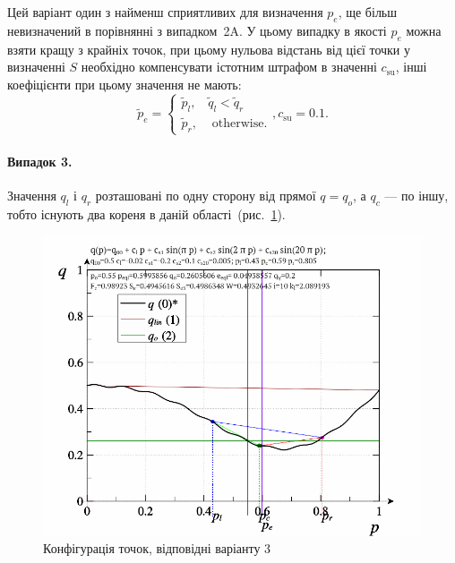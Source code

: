 Цей варіант один з найменш сприятливих для визначення
$ p_e $, ще більш невизначений в порівнянні з випадком~2A. У цьому
випадку в якості
$ p_e $ можна взяти кращу з крайніх точок, при цьому нульова
відстань від цієї точки у визначенні
$ S $ необхідно компенсувати істотним штрафом в значенні
$ c_\mathrm{su} $, інші коефіцієнти при цьому значення не мають:
%
\begin{equation}
  \tilde{p}_e
  =
  \begin{cases}
    \tilde{p}_{l}, & \tilde{q}_l < \tilde{q}_r
    \\
    \tilde{p}_{r}, & \text{ otherwise}.
  \end{cases}
  ,
  c_\mathrm{su} = 0.1 .
  \label{atu:eq:pr_e2C}
\end{equation}

\paragraph{Випадок 3.}%
%
Значення
$ q_l $ і
$ q_r $ розташовані по одну сторону від прямої
$ q = q_o $, а
$ q_c $ --- по іншу, тобто існують два кореня в даній
області~(рис.~\ref{atu:f:pq_3}).

\begin{figure}[htb!]
  \begin{center}
    \includegraphics[width=60\TW]{p/pq_sin-p_pq_double.png}
  \end{center}
  \caption{Конфігурація точок, відповідні варіанту 3}
  \label{atu:f:pq_3}
\end{figure}

